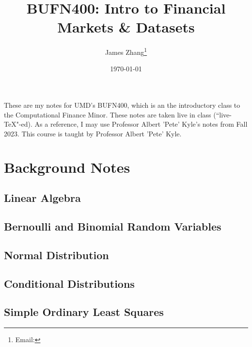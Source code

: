 \documentclass[12pt]{scrartcl}
\begin{document}
\title{BUFN400: Intro to Financial Markets \& Datasets}
\author{James Zhang\thanks{Email: }}
\date{\today}



\maketitle
    These are my notes for UMD's BUFN400, which is an the introductory class to the Computational Finance Minor. These notes are taken live in class (``live-\TeX"-ed). As a reference, I may use Professor Albert 'Pete' Kyle's notes from Fall 2023. This course is taught by Professor Albert 'Pete' Kyle. 
\tableofcontents
\newpage

\section{Background Notes}

\subsection{Linear Algebra}

\subsection{Bernoulli and Binomial Random Variables}

\subsection{Normal Distribution}

\subsection{Conditional Distributions}

\subsection{Simple Ordinary Least Squares}
\end{document}
